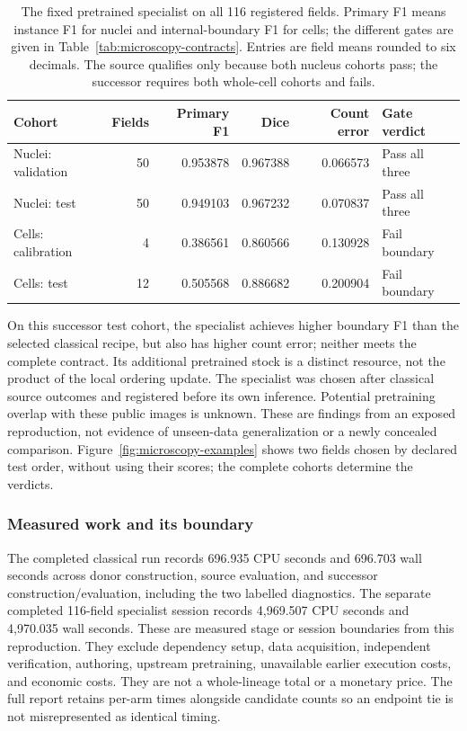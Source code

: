 \begin{table}[htbp]
\centering\small
\begin{tabularx}{\linewidth}{@{}P{1.52in}rrrrY@{}}
\toprule
\textbf{Cohort} & \textbf{Fields} & \textbf{Primary F1} & \textbf{Dice} & \textbf{Count error} & \textbf{Gate verdict}\\
\midrule
Nuclei: validation & 50 & 0.953878 & 0.967388 & 0.066573 & Pass all three\\
Nuclei: test & 50 & 0.949103 & 0.967232 & 0.070837 & Pass all three\\
Cells: calibration & 4 & 0.386561 & 0.860566 & 0.130928 & Fail boundary\\
Cells: test & 12 & 0.505568 & 0.886682 & 0.200904 & Fail boundary\\
\bottomrule
\end{tabularx}
\caption{The fixed pretrained specialist on all 116 registered fields. Primary F1 means instance F1 for nuclei and internal-boundary F1 for cells; the different gates are given in Table~\ref{tab:microscopy-contracts}. Entries are field means rounded to six decimals. The source qualifies only because both nucleus cohorts pass; the successor requires both whole-cell cohorts and fails.}
\label{tab:specialist-results}
\end{table}

On this successor test cohort, the specialist achieves higher boundary F1 than the selected classical recipe, but also has higher count error; neither meets the complete contract. Its additional pretrained stock is a distinct resource, not the product of the local ordering update. The specialist was chosen after classical source outcomes and registered before its own inference. Potential pretraining overlap with these public images is unknown. These are findings from an exposed reproduction, not evidence of unseen-data generalization or a newly concealed comparison. Figure~\ref{fig:microscopy-examples} shows two fields chosen by declared test order, without using their scores; the complete cohorts determine the verdicts.

\subsubsection{Measured work and its boundary}

The completed classical run records 696.935 CPU seconds and 696.703 wall seconds across donor construction, source evaluation, and successor construction/evaluation, including the two labelled diagnostics. The separate completed 116-field specialist session records 4,969.507 CPU seconds and 4,970.035 wall seconds. These are measured stage or session boundaries from this reproduction. They exclude dependency setup, data acquisition, independent verification, authoring, upstream pretraining, unavailable earlier execution costs, and economic costs. They are not a whole-lineage total or a monetary price. The full report retains per-arm times alongside candidate counts so an endpoint tie is not misrepresented as identical timing.

